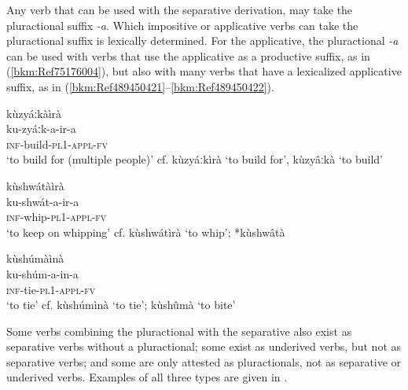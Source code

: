 Any verb that can be used with the separative derivation, may take the pluractional suffix \textit{-a}. Which impositive or applicative verbs can take the pluractional suffix is lexically determined. For the applicative, the pluractional \textit{-a} can be used with verbs that use the applicative as a productive suffix, as in (\ref{bkm:Ref75176004}), but also with many verbs that have a lexicalized applicative suffix, as in (\ref{bkm:Ref489450421}--\ref{bkm:Ref489450422}).

\ea
\label{bkm:Ref75176004}
kùzyáːkàìrà\\
ku-zyáːk-a-ir-a\\
\textsc{inf}-build-\textsc{pl}1-\textsc{appl}-\textsc{fv}\\
\glt ‘to build for (multiple people)’
cf. kùzyáːkìrà ‘to build for’, kùzyâːkà ‘to build’
\z

\ea
\label{bkm:Ref489450421}
kùshwátàìrà\\
ku-shwát-a-ir-a\\
\textsc{inf}-whip-\textsc{pl}1-\textsc{appl}-\textsc{fv}\\
\glt ‘to keep on whipping’
cf. kùshwátìrà ‘to whip’; *kùshwâtà
\z

\ea
\label{bkm:Ref489450422}
kùshúmàìnà\\
ku-shúm-a-in-a\\
\textsc{inf}-tie-\textsc{pl}1-\textsc{appl}-\textsc{fv}\\
\glt ‘to tie’
 cf. kùshúmìnà ‘to tie’; kùshûmà ‘to bite’
\z

Some verbs combining the pluractional with the separative also exist as separative verbs without a pluractional; some exist as underived verbs, but not as separative verbs; and some are only attested as pluractionals, not as separative or underived verbs. Examples of all three types are given in .

